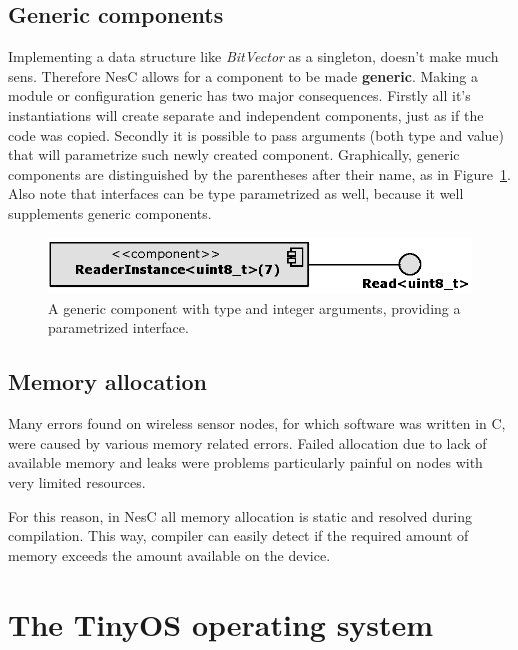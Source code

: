 \subsection{Generic components}

Implementing a data structure like \emph{BitVector} as a singleton,
doesn't make much sens. Therefore NesC allows for a component to be
made {\bf generic}. Making a module or configuration generic has two
major consequences.  Firstly all it's instantiations will create
separate and independent components, just as if the code was copied.
Secondly it is possible to pass arguments (both type and value) that
will parametrize such newly created component. Graphically, generic
components are distinguished by the parentheses after their name, as
in Figure~\ref{fig:generic_component}. Also note that interfaces can
be type parametrized as well, because it well supplements generic
components.

\begin{figure}[h]
  \centering
  \includegraphics{diagrams/generic_component.eps}
  \caption{A generic component with type and integer arguments,
  providing a parametrized interface.}
  \label{fig:generic_component}
\end{figure}

\subsection{Memory allocation}
Many errors found on wireless sensor nodes, for which software was
written in C, were caused by various memory related errors. Failed
allocation due to lack of available memory and leaks were problems
particularly painful on nodes with very limited resources.

For this reason, in NesC all memory allocation is static and resolved
during compilation. This way, compiler can easily detect if the
required amount of memory exceeds the amount available on the device.

\section{The TinyOS operating system}


